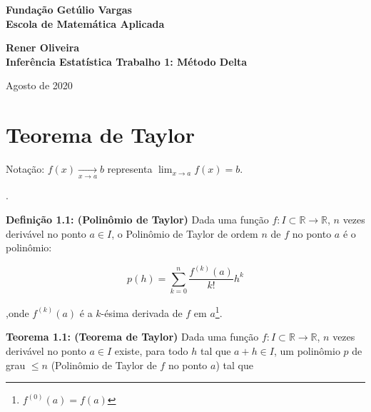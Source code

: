 \documentclass[12pt]{article}
\begin{document}
\begin{titlepage}
\begin{center}
\textbf{\LARGE Fundação Getúlio Vargas}\\ 
\textbf{\LARGE Escola de Matemática Aplicada}

\par
\vspace{160pt}
\textbf{\Large Rener Oliveira}\\
\vspace{160pt}
\textbf{\Large Inferência Estatística Trabalho 1: Método Delta}\\

\end{center}
\vspace{32pt}
\par
\vfill
\vspace{32pt}
\begin{center}
{\normalsize Agosto de 2020}
\end{center}
\end{titlepage}

\newpage
\tableofcontents



\newpage
\section{Teorema de Taylor}

Notação: $f(x)\underset{x\to a}{\longrightarrow}b$ representa $\displaystyle\lim_{x\to a}f(x)=b$.

.

\textbf{Definição 1.1: (Polinômio de Taylor)}\cite{lima1981curso} Dada uma função $f:I\subset\mathbb{R}\longrightarrow \mathbb{R}$, $n$ vezes derivável no ponto $a\in I$, o Polinômio de Taylor de ordem $n$ de $f$ no ponto $a$ é o polinômio:

$$p(h)=\displaystyle\sum_{k=0}^{n}\dfrac{f^{(k)}(a)}{k!}h^k$$

,onde $f^{(k)}(a)$ é a $k$-ésima derivada de $f$ em $a$\footnote{$f^{(0)}(a)=f(a)$}.

\textbf{Teorema 1.1: (Teorema de Taylor)}\cite{lima1981curso} Dada uma função $f:I\subset\mathbb{R}\rightarrow \mathbb{R}$, $n$ vezes derivável no ponto $a\in I$ existe, para todo $h$ tal que $a+h\in I$, um polinômio $p$ de grau $\leq n$ (Polinômio de Taylor de $f$ no ponto $a$) tal que
\end{document}
